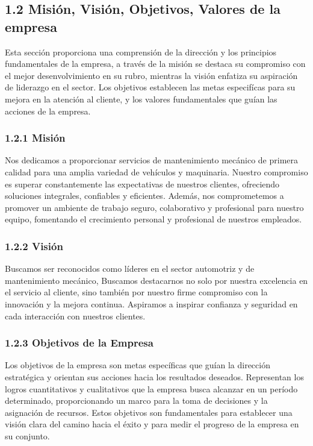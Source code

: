 \subsection{1.2 Misión, Visión, Objetivos, Valores de la empresa}
Esta sección proporciona una comprensión de la dirección y los principios fundamentales de la empresa, a través de la misión se destaca su compromiso con el mejor desenvolvimiento en su rubro, mientras la visión enfatiza su aspiración de liderazgo en el sector. Los objetivos establecen las metas especifícas para su mejora en la atención al cliente, y los valores fundamentales que guían las acciones de la empresa.
\subsubsection*{1.2.1 Misión}
Nos dedicamos a proporcionar servicios de mantenimiento mecánico de primera calidad para una amplia variedad de vehículos y maquinaria. Nuestro compromiso es superar constantemente las expectativas de nuestros clientes, ofreciendo soluciones integrales, confiables y eficientes. Además, nos comprometemos a promover un ambiente de trabajo seguro, colaborativo y profesional para nuestro equipo, fomentando el crecimiento personal y profesional de nuestros empleados.
\subsubsection*{1.2.2 Visión}
Buscamos ser reconocidos como líderes en el sector automotriz y de mantenimiento mecánico, Buscamos destacarnos no solo por nuestra excelencia en el servicio al cliente, sino también por nuestro firme compromiso con la innovación y la mejora continua. Aspiramos a inspirar confianza y seguridad en cada interacción con nuestros clientes.


\subsubsection*{1.2.3 Objetivos de la Empresa}
Los objetivos de la empresa son metas específicas que guían la dirección estratégica y orientan sus acciones hacia los resultados deseados. Representan los logros cuantitativos y cualitativos que la empresa busca alcanzar en un período determinado, proporcionando un marco para la toma de decisiones y la asignación de recursos. Estos objetivos son fundamentales para establecer una visión clara del camino hacia el éxito y para medir el progreso de la empresa en su conjunto.



